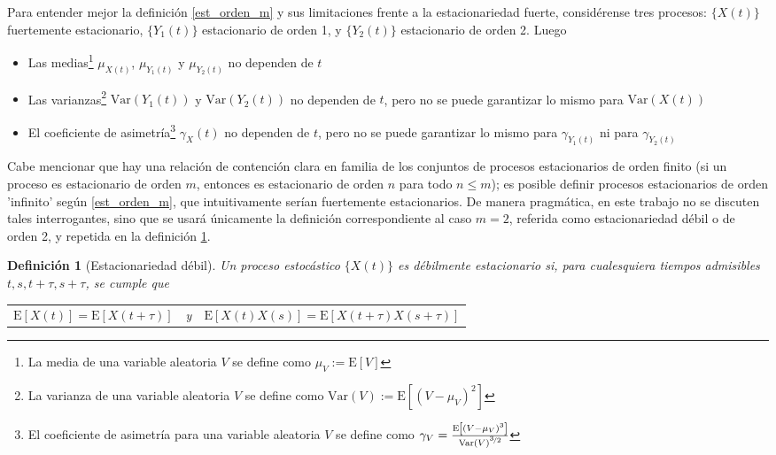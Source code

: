 \documentclass[12pt,a4paper]{mitthesis}
\newtheorem{defn}{Definici\'on}
\newcommand{\E}[1]{\mathrm{E}\left[ #1 \right]}
\newcommand{\Var}[1]{\mathrm{Var}\left( #1 \right)}
\begin{document}
Para entender mejor la definici\'on \ref{est_orden_m} y sus limitaciones frente a la 
estacionariedad fuerte, consid\'erense tres procesos: $\{X(t)\}$ fuertemente estacionario, 
$\{Y_1(t)\}$ estacionario de orden 1, y $\{Y_2(t)\}$ estacionario de orden 2. Luego
\begin{itemize}
\item Las medias\footnote{La media de una variable aleatoria $V$ se define como $ \mu_V := \E{V}$} 
$ \mu_{X(t)}$, $ \mu_{Y_1(t)}$ y $ \mu_{Y_2(t)}$ no dependen de $t$

\item Las varianzas\footnote{La varianza de una variable aleatoria $V$ se define como 
$ \Var{V} := \E{\left(V - \mu_V \right)^{2}}$} $ \Var{Y_1(t)}$ y $ \Var{Y_2(t)}$ no dependen de 
$t$, pero no se puede garantizar lo mismo para $\Var{X(t)}$

\item El coeficiente de asimetr\'ia\footnote{El coeficiente de asimetr\'ia para una variable 
aleatoria $V$ se define como 
$\gamma_V = \frac{\E{\left(V-\mu_V\right)^{3}}}{\Var{V}^{\nicefrac{3}{2}}}$}
$ \gamma_X(t)$ no dependen de $t$, pero no se puede garantizar lo mismo para $ \gamma_{Y_1(t)}$ ni 
para $ \gamma_{Y_2(t)}$
\end{itemize}

Cabe mencionar que hay una relaci\'on de contenci\'on clara en familia de los conjuntos de procesos 
estacionarios de orden finito (si un proceso es estacionario de orden $m$, entonces es estacionario 
de orden $n$ para todo $n \leq m$); es posible definir procesos estacionarios de orden 'infinito' 
seg\'un \ref{est_orden_m}, que intuitivamente ser\'ian fuertemente estacionarios. 
De manera pragm\'atica, en este trabajo no se discuten tales interrogantes, sino que se usar\'a 
\'unicamente la definici\'on correspondiente al caso $m=2$, referida como estacionariedad d\'ebil o 
de orden 2, y repetida en la definici\'on \ref{est_orden_2}.

\begin{defn}[Estacionariedad d\'ebil]
Un proceso estoc\'astico $\{ X(t) \}$ es d\'ebilmente estacionario si, para cualesquiera tiempos 
admisibles $t, s, t+\tau, s+\tau$, se cumple que
\begin{center}
\begin{tabular}{ccc}
$\E{X(t)} = \E{X(t+\tau)}$
& y &
$\E{X(t)X(s)} = \E{X(t+\tau)X(s+\tau)}$
\end{tabular}
\end{center}
\label{est_orden_2}
\end{defn}
\end{document}
